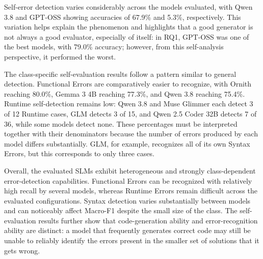 Self-error detection varies considerably across the models evaluated, with Qwen 3.8 and GPT-OSS showing accuracies of 67.9\% and 5.3\%, respectively. This variation helps explain the phenomenon and highlights that a good generator is not always a good evaluator, especially of itself: in RQ1, GPT-OSS was one of the best models, with 79.0\% accuracy; however, from this self-analysis perspective, it performed the worst.

The class-specific self-evaluation results follow a pattern similar to general detection. Functional Errors are comparatively easier to recognize, with Ornith reaching 80.0\%, Gemma 3 4B reaching 77.3\%, and Qwen 3.8 reaching 75.4\%. Runtime self-detection remains low: Qwen 3.8 and Muse Glimmer each detect 3 of 12 Runtime cases, GLM detects 3 of 15, and Qwen 2.5 Coder 32B detects 7 of 36, while some models detect none. These percentages must be interpreted together with their denominators because the number of errors produced by each model differs substantially. GLM, for example, recognizes all of its own Syntax Errors, but this corresponds to only three cases.

Overall, the evaluated SLMs exhibit heterogeneous and strongly class-dependent error-detection capabilities. Functional Errors can be recognized with relatively high recall by several models, whereas Runtime Errors remain difficult across the evaluated configurations. Syntax detection varies substantially between models and can noticeably affect Macro-F1 despite the small size of the class. The self-evaluation results further show that code-generation ability and error-recognition ability are distinct: a model that frequently generates correct code may still be unable to reliably identify the errors present in the smaller set of solutions that it gets wrong.
